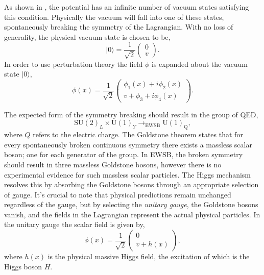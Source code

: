 As shown in , the potential has an infinite number of vacuum states satisfying this condition.
Physically the vacuum will fall into one of these states, spontaneously breaking the symmetry of the Lagrangian.
With no loss of generality, the physical vacuum state is chosen to be,
\begin{equation}
    \label{eq:higgs_vacuum}
    | 0 \rangle	= \frac{1}{\sqrt{2}} \begin{pmatrix} 0 \\ v \end{pmatrix}.
\end{equation}
In order to use perturbation theory the field $\phi$ is expanded about the vacuum state $|0\rangle$,
\begin{equation}
    \phi(x) = \frac{1}{\sqrt{2}} \begin{pmatrix} \phi_1(x) + i \phi_2(x) \\ v + \phi_3 + i \phi_4(x) \end{pmatrix}.
\end{equation}

The expected form of the symmetry breaking should result in the group of QED,
\begin{equation}
    \text{SU}(2)_L \times \text{U}(1)_Y \rightarrow_\text{EWSB} \text{U}(1)_\text{Q},
\end{equation}
where $Q$ refers to the electric charge.
The Goldstone theorem states that for every spontaneously broken continuous symmetry there exists a massless scalar boson; one for each generator of the group.
In EWSB, the broken symmetry should result in three massless Goldstone bosons, however there is no experimental evidence for such massless scalar particles.
The Higgs mechanism resolves this by absorbing the Goldstone bosons through an appropriate selection of gauge.
It's crucial to note that physical predictions remain unchanged regardless of the gauge, but by selecting the \textit{unitary gauge}, the Goldstone bosons vanish, and the fields in the Lagrangian represent the actual physical particles.
In the unitary gauge the scalar field is given by,
\begin{equation}
    \label{eq:higgs_unitary_gauge}
    \phi(x) = \frac{1}{\sqrt{2}} \begin{pmatrix} 0 \\ v + h(x) \end{pmatrix},
\end{equation}
where $h(x)$ is the physical massive Higgs field, the excitation of which is the Higgs boson $H$.

